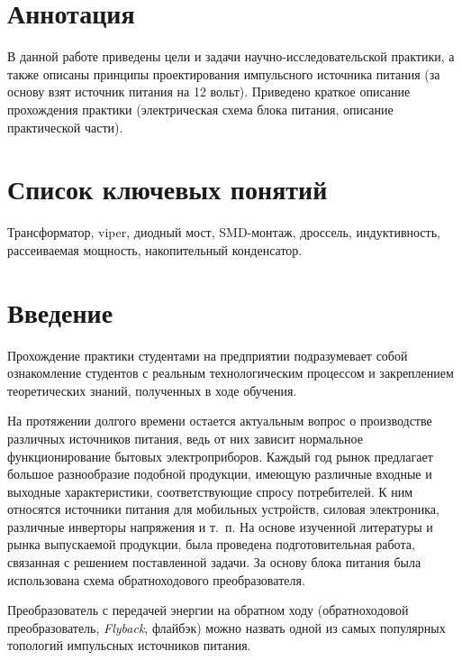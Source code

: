  


  \setcounter{page}{3}
\section*{Аннотация}

В данной работе приведены цели и задачи научно-исследовательской практики, а
также описаны принципы проектирования импульсного источника питания (за основу
взят источник питания на 12 вольт). Приведено краткое описание прохождения
практики (электрическая схема блока питания, описание практической части).

\section*{Список ключевых понятий}

Трансформатор, viper, диодный мост, SMD-монтаж, дроссель, индуктивность,
рассеиваемая мощность, накопительный конденсатор.

\newpage

\tableofcontents \newpage
\section*{Введение} Прохождение практики студентами на предприятии подразумевает
собой ознакомление студентов с реальным технологическим процессом и закреплением
теоретических знаний, полученных в ходе обучения.
	
На протяжении долгого времени остается актуальным вопрос о производстве
различных источников питания, ведь от них зависит нормальное функционирование
бытовых электроприборов. Каждый год рынок предлагает большое разнообразие
подобной продукции, имеющую различные входные и выходные характеристики,
соответствующие спросу потребителей. К ним относятся источники питания для
мобильных устройств, силовая электроника, различные инверторы напряжения и т.~п.
На основе изученной литературы и рынка выпускаемой продукции, была проведена
подготовительная работа, связанная с решением поставленной задачи. За основу
блока питания была использована схема обратноходового преобразователя.
	
Преобразователь с передачей энергии на обратном ходу (обратноходовой
преобразователь, \emph{Flyback}, флайбэк) можно назвать одной из самых
популярных топологий импульсных источников питания.

